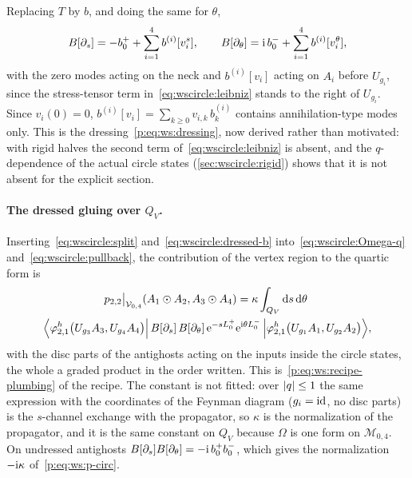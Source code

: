 Replacing $T$ by $b$, and doing the same for $\theta$,
\begin{equation}
  \label{eq:wscircle:dressed-b}
  B[\partial_s]
    = - b_0^+ + \sum_{i = 1}^4 b^{(i)}[v_i^s],
  \qquad
  B[\partial_\theta]
    = \mathrm{i} \, b_0^- + \sum_{i = 1}^4 b^{(i)}[v_i^\theta],
\end{equation}
with the zero modes acting on the neck and $b^{(i)}[v_i]$ acting on $A_i$ before $U_{g_i}$, since the stress-tensor term in~\eqref{eq:wscircle:leibniz} stands to the right of $U_{g_i}$.
Since $v_i(0) = 0$, $b^{(i)}[v_i] = \sum_{k \geq 0} v_{i, k} \, b_k^{(i)}$ contains annihilation-type modes only.
This is the dressing~\eqref{p:eq:ws:dressing}, now derived rather than motivated: with rigid halves the second term of~\eqref{eq:wscircle:leibniz} is absent, and the $q$-dependence of the actual circle states (\cref{sec:wscircle:rigid}) shows that it is not absent for the explicit section.

\paragraph{The dressed gluing over \texorpdfstring{$Q_V$}{QV}.}
Inserting~\eqref{eq:wscircle:split} and~\eqref{eq:wscircle:dressed-b} into~\eqref{eq:wscircle:Omega-q} and~\eqref{eq:wscircle:pullback}, the contribution of the vertex region to the quartic form is
\begin{multline}
  \label{eq:wscircle:theorem}
  p_{2,2} \big|_{\mathcal V_{0,4}} (A_1 \odot A_2, A_3 \odot A_4)
    = \kappa \int_{Q_V} \mathrm{d} s \, \mathrm{d}\theta \;
  \\
    \Big\langle \varphi^h_{2,1} \big( U_{g_3} A_3, U_{g_4} A_4 \big) \Big| \, B[\partial_s] \, B[\partial_\theta] \, \mathrm{e}^{- s L_0^+} \mathrm{e}^{\mathrm{i} \theta L_0^-} \, \Big| \varphi^h_{2,1} \big( U_{g_1} A_1, U_{g_2} A_2 \big) \Big\rangle,
\end{multline}
with the disc parts of the antighosts acting on the inputs inside the circle states, the whole a graded product in the order written.
This is~\eqref{p:eq:ws:recipe-plumbing} of the recipe.
The constant is not fitted: over ${|q|} \leq 1$ the same expression with the coordinates of the Feynman diagram ($g_i = \mathrm{id}$, no disc parts) is the $s$-channel exchange with the propagator, so $\kappa$ is the normalization of the propagator, and it is the same constant on $Q_V$ because $\Omega$ is one form on $\mathcal M_{0,4}$.
On undressed antighosts $B[\partial_s] B[\partial_\theta] = - \mathrm{i} \, b_0^+ b_0^-$, which gives the normalization $- \mathrm{i} \kappa$ of~\eqref{p:eq:ws:p-circ}.

